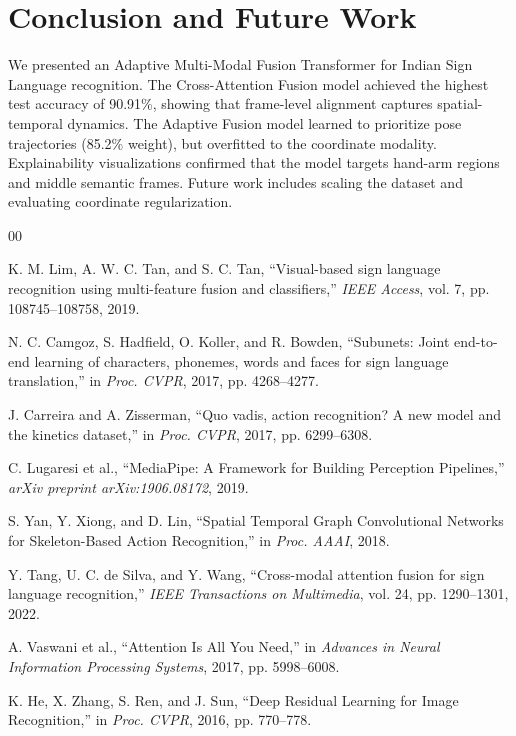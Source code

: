\documentclass[conference]{IEEEtran}
\begin{document}
\section{Conclusion and Future Work}

We presented an Adaptive Multi-Modal Fusion Transformer for Indian Sign Language recognition. The Cross-Attention Fusion model achieved the highest test accuracy of 90.91\%, showing that frame-level alignment captures spatial-temporal dynamics. The Adaptive Fusion model learned to prioritize pose trajectories (85.2\% weight), but overfitted to the coordinate modality. Explainability visualizations confirmed that the model targets hand-arm regions and middle semantic frames. Future work includes scaling the dataset and evaluating coordinate regularization.

\begin{thebibliography}{00}

K. M. Lim, A. W. C. Tan, and S. C. Tan, ``Visual-based sign language recognition using multi-feature fusion and classifiers,'' \textit{IEEE Access}, vol. 7, pp. 108745--108758, 2019.

N. C. Camgoz, S. Hadfield, O. Koller, and R. Bowden, ``Subunets: Joint end-to-end learning of characters, phonemes, words and faces for sign language translation,'' in \textit{Proc. CVPR}, 2017, pp. 4268--4277.

J. Carreira and A. Zisserman, ``Quo vadis, action recognition? A new model and the kinetics dataset,'' in \textit{Proc. CVPR}, 2017, pp. 6299--6308.

C. Lugaresi et al., ``MediaPipe: A Framework for Building Perception Pipelines,'' \textit{arXiv preprint arXiv:1906.08172}, 2019.

S. Yan, Y. Xiong, and D. Lin, ``Spatial Temporal Graph Convolutional Networks for Skeleton-Based Action Recognition,'' in \textit{Proc. AAAI}, 2018.

Y. Tang, U. C. de Silva, and Y. Wang, ``Cross-modal attention fusion for sign language recognition,'' \textit{IEEE Transactions on Multimedia}, vol. 24, pp. 1290--1301, 2022.

A. Vaswani et al., ``Attention Is All You Need,'' in \textit{Advances in Neural Information Processing Systems}, 2017, pp. 5998--6008.

K. He, X. Zhang, S. Ren, and J. Sun, ``Deep Residual Learning for Image Recognition,'' in \textit{Proc. CVPR}, 2016, pp. 770--778.


\end{thebibliography}
\end{document}
